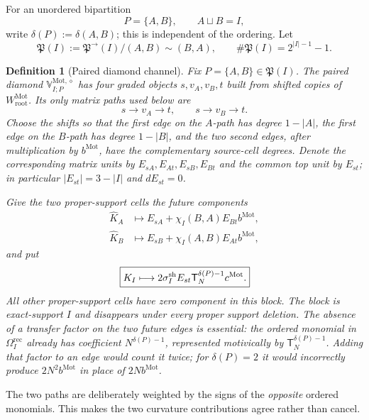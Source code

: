 \documentclass[11pt]{article}
\newtheorem{definition}[theorem]{Definition}
\theoremstyle{remark}
\newcommand{\Mot}{\mathrm{Mot}}
\newcommand{\rootc}{\mathrm{root}}
\begin{document}
For an unordered bipartition
\[
 P=\{A,B\},\qquad A\sqcup B=I,
\]
write $\delta(P):=\delta(A,B)$; this is independent of the ordering.  Let
\[
 \mathfrak P(I)
 :=\mathfrak P^{\to}(I)/(A,B)\sim(B,A),
 \qquad
 \#\mathfrak P(I)=2^{|I|-1}-1.
\]

\begin{definition}[Paired diamond channel]
\label{P2M-def:paired-diamond-channel}
Fix $P=\{A,B\}\in\mathfrak P(I)$.  The paired diamond
$\mathbb V_{I;P}^{\Mot,\diamond}$ has four graded objects
$s,v_A,v_B,t$ built from shifted copies of $W_{\rootc}^{\Mot}$.  Its only
matrix paths used below are
\[
 s\longrightarrow v_A\longrightarrow t,
 \qquad
 s\longrightarrow v_B\longrightarrow t.
\]
Choose the shifts so that the first edge on the $A$-path has degree
$1-|A|$, the first edge on the $B$-path has degree $1-|B|$, and the two
second edges, after multiplication by $b^{\Mot}$, have the complementary
source-cell degrees.  Denote the corresponding matrix units by
$E_{sA},E_{At},E_{sB},E_{Bt}$ and the common top unit by $E_{st}$; in
particular $|E_{st}|=3-|I|$ and $dE_{st}=0$.

Give the two proper-support cells the future components
\begin{align}
 \widehat K_A
 &\longmapsto
 E_{sA}
 +\chi_I(B,A)E_{Bt}b^{\Mot},
 \\
 \widehat K_B
 &\longmapsto
 E_{sB}
 +\chi_I(A,B)E_{At}b^{\Mot},
\end{align}
and put
\begin{equation}
 \boxed{
 K_I\longmapsto
 2\sigma_I^{\rm sh}E_{st}
 \mathsf T_N^{\delta(P)-1}c^{\Mot}.}
 \label{P2M-eq:paired-diamond-carry}
\end{equation}
All other proper-support cells have zero component in this block.  The block
is exact-support $I$ and disappears under every proper support deletion.
The absence of a transfer factor on the two future edges is essential: the
ordered monomial in $\Omega_I^{\mathrm{rec}}$ already has coefficient
$N^{\delta(P)-1}$, represented motivically by
$\mathsf T_N^{\delta(P)-1}$.  Adding that factor to an edge would count it
twice; for $\delta(P)=2$ it would incorrectly produce $2N^2b^{\Mot}$ in
place of $2Nb^{\Mot}$.
\end{definition}

The two paths are deliberately weighted by the signs of the \emph{opposite}
ordered monomials.  This makes the two curvature contributions agree rather
than cancel.
\end{document}
